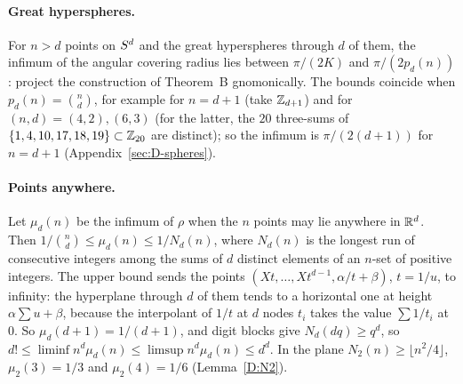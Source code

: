 \documentclass[11pt]{article}
\begin{document}
\paragraph{Great hyperspheres.} For $n>d$ points on $S^d$ and the great hyperspheres through $d$ of
them, the infimum of the angular covering radius lies between $\pi/(2K)$ and $\pi/(2p_d(n))$: project
the construction of Theorem~B gnomonically. The bounds coincide when $p_d(n)=\binom nd$, for example for
$n=d+1$ (take $\mathbb{Z}_{d+1}$) and for $(n,d)=(4,2),(6,3)$ (for the latter, the $20$ three-sums of $\{1,4,10,17,18,19\}\subset\mathbb{Z}_{20}$ are distinct); so the infimum is $\pi/(2(d+1))$ for $n=d+1$
(Appendix~\ref{sec:D-spheres}).

\paragraph{Points anywhere.} Let $\mu_d(n)$ be the infimum of $\rho$ when the $n$ points may lie
anywhere in $\mathbb{R}^d$. Then $1/\binom nd\le\mu_d(n)\le1/N_d(n)$, where $N_d(n)$ is the longest run of
consecutive integers among the sums of $d$ distinct elements of an $n$-set of positive integers. The
upper bound sends the points $(Xt,\dots,Xt^{d-1},\alpha/t+\beta)$, $t=1/u$, to infinity: the hyperplane
through $d$ of them tends to a horizontal one at height $\alpha\sum u+\beta$, because the interpolant of
$1/t$ at $d$ nodes $t_i$ takes the value $\sum1/t_i$ at $0$. So $\mu_d(d+1)=1/(d+1)$, and digit blocks
give $N_d(dq)\ge q^d$, so $d!\le\liminf n^d\mu_d(n)\le\limsup n^d\mu_d(n)\le d^d$. In the plane
$N_2(n)\ge\lfloor n^2/4\rfloor$, $\mu_2(3)=1/3$ and $\mu_2(4)=1/6$ (Lemma~\ref{D:N2}).
\end{document}
